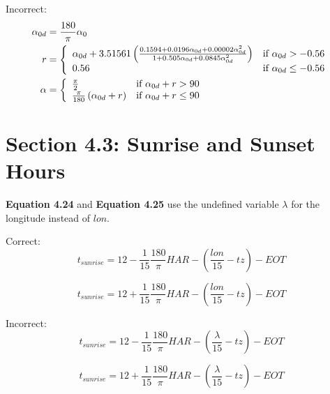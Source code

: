 \documentclass[report]{nrel}
\begin{document}
Incorrect:
\begin{align*}
\alpha_{0d} &= \frac{180}{\pi}\alpha_0\notag\\
r &= \left\{
\begin{array}{ll}
\alpha_{0d} + 3.51561\left(\frac{0.1594 + 0.0196\alpha_{0d} + 0.00002\alpha_{0d}^2}{1 + 0.505\alpha_{0d} + 0.0845\alpha_{0d}^2}\right) & \text{if $\alpha_{0d}>-0.56$}\\
0.56 & \text{if $\alpha_{0d} \leq -0.56$}
\end{array}
\right.\notag\\
\alpha & = \left\{
\begin{array}{ll}
\frac{\pi}{2} & \text{if $\alpha_{0d} + r > 90$}\\
\frac{\pi}{180}\left(\alpha_{0d} + r\right) & \text{if $\alpha_{0d} + r \leq 90$}
\end{array}
\right.
\end{align*}

\section*{Section 4.3: Sunrise and Sunset Hours}

\textbf{Equation 4.24} and \textbf{Equation 4.25} use the undefined variable $\lambda$ for the longitude instead of $lon$.

Correct:
\begin{equation*}
t_{sunrise} = 12 - \frac{1}{15} \frac{180}{\pi}\mathit{HAR} - \left(\frac{\mathit{lon}}{15} - \mathit{tz}\right)-\mathit{EOT}
\end{equation*}

\begin{equation*}
t_{sunrise} = 12 + \frac{1}{15} \frac{180}{\pi}\mathit{HAR} - \left(\frac{\mathit{lon}}{15} - \mathit{tz}\right)-\mathit{EOT}
\end{equation*}

Incorrect:
\begin{equation*}
t_{sunrise} = 12 - \frac{1}{15} \frac{180}{\pi}\mathit{HAR} - \left(\frac{\lambda}{15} - \mathit{tz}\right)-\mathit{EOT}
\end{equation*}

\begin{equation*}
t_{sunrise} = 12 + \frac{1}{15} \frac{180}{\pi}\mathit{HAR} - \left(\frac{\lambda}{15} - \mathit{tz}\right)-\mathit{EOT}
\end{equation*}
\end{document}

